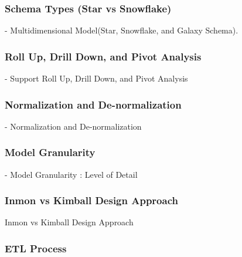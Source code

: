 \begin{frame}
\frametitle{Schema Types (Star vs Snowflake)}
- Multidimensional Model(Star, Snowflake, and Galaxy Schema).\\

\end{frame}


\begin{frame}
\frametitle{Roll Up, Drill Down, and Pivot Analysis}

- Support Roll Up, Drill Down, and Pivot Analysis\\

\end{frame}


\begin{frame}
\frametitle{Normalization and De-normalization}

- Normalization and De-normalization\\
\end{frame}


\begin{frame}
\frametitle{Model Granularity}

- Model Granularity : Level of Detail\\
\end{frame}



\begin{frame}
\frametitle{Inmon vs Kimball Design Approach }

Inmon vs Kimball Design Approach

\end{frame}

\subsubsection{ETL Process}

